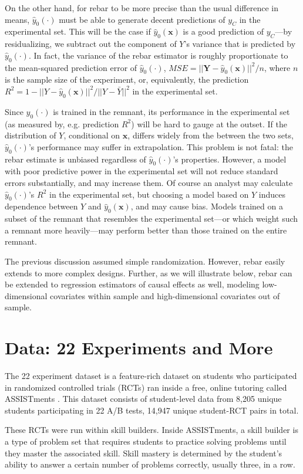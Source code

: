 \documentclass{edm_template}
\newcommand{\model}{\hat{y}_0(\cdot)}
\newcommand{\pred}{\hat{y}_0(\bm{x})}
\begin{document}
On the other hand, for rebar to be more precise than the usual difference in means, $\model$ must be able to generate decent predictions of $y_C$ in the experimental set. 
This will be the case if $\pred$ is a good prediction of $y_C$---by residualizing, we subtract out the component of $Y$'s variance that is predicted by $\model$. 
In fact, the variance of the rebar estimator is roughly proportionate to the mean-squared prediction error of $\model$, $MSE=||\bm{Y}-\pred||^2/n$, where $n$ is the sample size of the experiment, or, equivalently, the prediction $R^2=1-||Y-\pred||^2/||Y-\bar{Y}||^2$ in the experimental set. 

Since $\model$ is trained in the remnant, its performance in the experimental set (as measured by, e.g. prediction $R^2$) will be hard to gauge at the outset. 
If the distribution of $Y$, conditional on $\bm{x}$, differs widely from the between the two sets, $\model$'s performance may suffer in extrapolation. 
This problem is not fatal: the rebar estimate is unbiased regardless of $\model$'s properties.
However, a model with poor predictive power in the experimental set will not reduce standard errors substantially, and may increase them.
Of course an analyst may calculate $\model$'s $R^2$ in the experimental set, but choosing a model based on $Y$ induces dependence between $Y$ and $\pred$, and may cause bias. 
Models trained on a subset of the remnant that resembles the experimental set---or which weight such a remnant more heavily---may perform better than those trained on the entire remnant. 

The previous discussion assumed simple randomization. 
However, rebar easily extends to more complex designs.
Further, as we will illustrate below, rebar can be extended to regression estimators of causal effects as well, modeling low-dimensional covariates within sample and high-dimensional covariates out of sample. 

\section{Data: 22 Experiments and More}\label{sec:data}
The 22 experiment dataset is a feature-rich dataset on students who participated in randomized controlled trials (RCTs) ran inside a free, online tutoring called ASSISTments \cite{data}. This dataset consists of student-level data from 8,205 unique students participating in 22 A/B tests, 14,947 unique student-RCT pairs in total. 

These RCTs were run within skill builders. Inside ASSISTments, a skill builder is a type of problem set that requires students to practice solving problems until they master the associated skill. Skill mastery is determined by the student's ability to answer a certain number of problems correctly, usually three, in a row.
\end{document}
